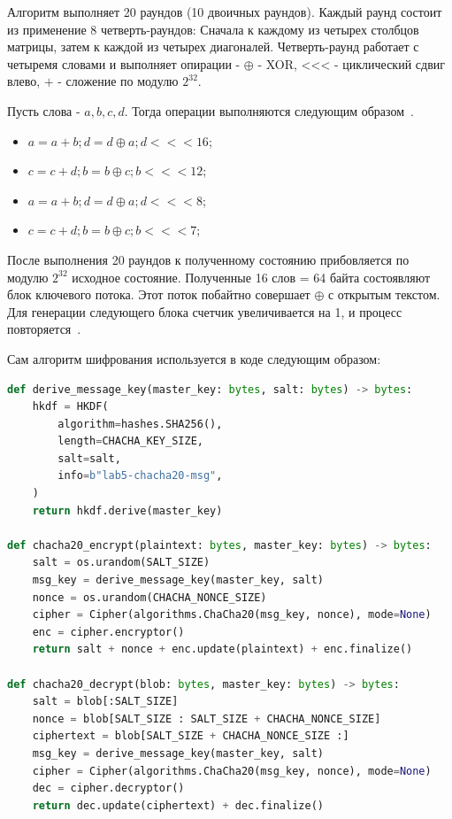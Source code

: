 \documentclass[areasetadvanced]{scrartcl}
\begin{document}
Алгоритм выполняет 20 раундов (10 двоичных раундов). Каждый раунд состоит из применение 8 четверть-раундов: Сначала к каждому из четырех столбцов матрицы,
затем к каждой из четырех диагоналей. Четверть-раунд работает с четыремя словами и выполняет опирации - $\oplus$ - XOR, <<< - циклический сдвиг влево, $+$ - сложение по модулю $2^{32}$.

Пусть слова - $a, b, c, d$. Тогда операции выполняются следующим образом~\cite{chacha20}.
\begin{itemize}
    \item $a = a + b; d = d \oplus a; d <<< 16$;
    \item $c = c + d; b = b \oplus c; b <<< 12$;
    \item $a = a + b; d = d \oplus a; d <<< 8$;
    \item $c = c + d; b = b \oplus c; b <<< 7$;
\end{itemize}

После выполнения 20 раундов к полученному состоянию прибовляется по модулю $2^{32}$ исходное состояние. Полученные 16 слов = 64 байта состоявляют блок ключевого потока. 
Этот поток побайтно совершает $\oplus$ с открытым текстом. Для генерации следующего блока счетчик увеличивается на 1, и процесс повторяется~\cite{chacha20}.

Сам алгоритм шифрования используется в коде следующим образом:

\begin{lstlisting}[language=Python]
def derive_message_key(master_key: bytes, salt: bytes) -> bytes:
    hkdf = HKDF(
        algorithm=hashes.SHA256(),
        length=CHACHA_KEY_SIZE,
        salt=salt,
        info=b"lab5-chacha20-msg",
    )
    return hkdf.derive(master_key)

def chacha20_encrypt(plaintext: bytes, master_key: bytes) -> bytes:
    salt = os.urandom(SALT_SIZE)
    msg_key = derive_message_key(master_key, salt)
    nonce = os.urandom(CHACHA_NONCE_SIZE)
    cipher = Cipher(algorithms.ChaCha20(msg_key, nonce), mode=None)
    enc = cipher.encryptor()
    return salt + nonce + enc.update(plaintext) + enc.finalize()

def chacha20_decrypt(blob: bytes, master_key: bytes) -> bytes:
    salt = blob[:SALT_SIZE]
    nonce = blob[SALT_SIZE : SALT_SIZE + CHACHA_NONCE_SIZE]
    ciphertext = blob[SALT_SIZE + CHACHA_NONCE_SIZE :]
    msg_key = derive_message_key(master_key, salt)
    cipher = Cipher(algorithms.ChaCha20(msg_key, nonce), mode=None)
    dec = cipher.decryptor()
    return dec.update(ciphertext) + dec.finalize()
\end{lstlisting}
\end{document}
